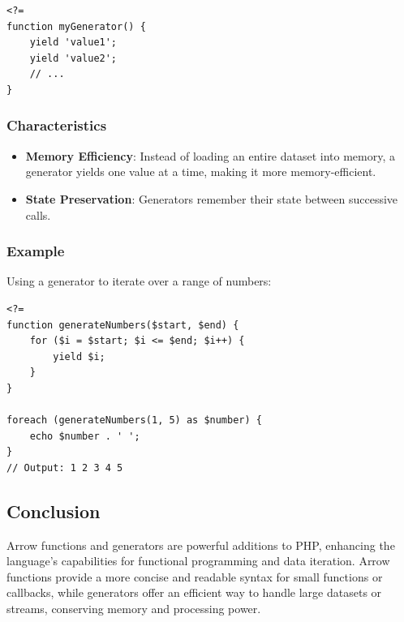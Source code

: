 \documentclass[11pt]{article}
\begin{document}
\begin{verbatim}
<?=
function myGenerator() {
    yield 'value1';
    yield 'value2';
    // ...
}
\end{verbatim}

\subsubsection{Characteristics}
\label{sec:org663b641}
\begin{itemize}
\item \textbf{Memory Efficiency}: Instead of loading an entire dataset into memory,
a generator yields one value at a time, making it more
memory-efficient.
\item \textbf{State Preservation}: Generators remember their state between
successive calls.
\end{itemize}

\subsubsection{Example}
\label{sec:orgad15ad9}
Using a generator to iterate over a range of numbers:

\begin{verbatim}
<?=
function generateNumbers($start, $end) {
    for ($i = $start; $i <= $end; $i++) {
        yield $i;
    }
}

foreach (generateNumbers(1, 5) as $number) {
    echo $number . ' ';
}
// Output: 1 2 3 4 5
\end{verbatim}

\subsection{Conclusion}
\label{sec:org4618ad3}
Arrow functions and generators are powerful additions to PHP, enhancing
the language's capabilities for functional programming and data
iteration. Arrow functions provide a more concise and readable syntax
for small functions or callbacks, while generators offer an efficient
way to handle large datasets or streams, conserving memory and
processing power.
\end{document}

